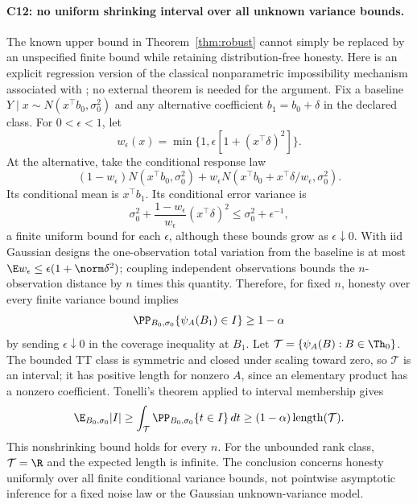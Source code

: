 \paragraph{C12: no uniform shrinking interval over all unknown variance bounds.}
The known upper bound in Theorem~\ref{thm:robust} cannot simply be replaced by an unspecified finite bound while retaining distribution-free honesty. Here is an explicit regression version of the classical nonparametric impossibility mechanism associated with \citet{bahadur1956}; no external theorem is needed for the argument.
Fix a baseline $Y\mid x\sim N(x^\top b_0,\sigma_0^2)$ and any alternative coefficient $b_1=b_0+\delta$ in the declared class. For $0<\epsilon<1$, let
\[
 w_\epsilon(x)=\min\{1,\epsilon[1+(x^\top\delta)^2]\}.
\]
At the alternative, take the conditional response law
\[
 (1-w_\epsilon)N(x^\top b_0,\sigma_0^2)
 +w_\epsilon N(x^\top b_0+x^\top\delta/w_\epsilon,\sigma_0^2).
\]
Its conditional mean is $x^\top b_1$. Its conditional error variance is
\[
 \sigma_0^2+\frac{1-w_\epsilon}{w_\epsilon}(x^\top\delta)^2
 \le\sigma_0^2+\epsilon^{-1},
\]
a finite uniform bound for each $\epsilon$, although these bounds grow as $\epsilon\downarrow0$. With iid Gaussian designs the one-observation total variation from the baseline is at most $\E w_\epsilon\le\epsilon(1+\norm\delta^2)$; coupling independent observations bounds the $n$-observation distance by $n$ times this quantity. Therefore, for fixed $n$, honesty over every finite variance bound implies
\[
 \PP_{B_0,\sigma_0}\{\psi_A(B_1)\in I\}\ge1-\alpha
\]
by sending $\epsilon\downarrow0$ in the coverage inequality at $B_1$.
Let $\mathcal T=\{\psi_A(B):B\in\Th_0\}$. The bounded TT class is symmetric and closed under scaling toward zero, so $\mathcal T$ is an interval; it has positive length for nonzero $A$, since an elementary product has a nonzero coefficient. Tonelli's theorem applied to interval membership gives
\[
 \E_{B_0,\sigma_0}|I|\ge\int_{\mathcal T}
       \PP_{B_0,\sigma_0}\{t\in I\}\,dt
 \ge(1-\alpha)\operatorname{length}(\mathcal T).
\]
This nonshrinking bound holds for every $n$. For the unbounded rank class, $\mathcal T=\R$ and the expected length is infinite. The conclusion concerns honesty uniformly over all finite conditional variance bounds, not pointwise asymptotic inference for a fixed noise law or the Gaussian unknown-variance model.
